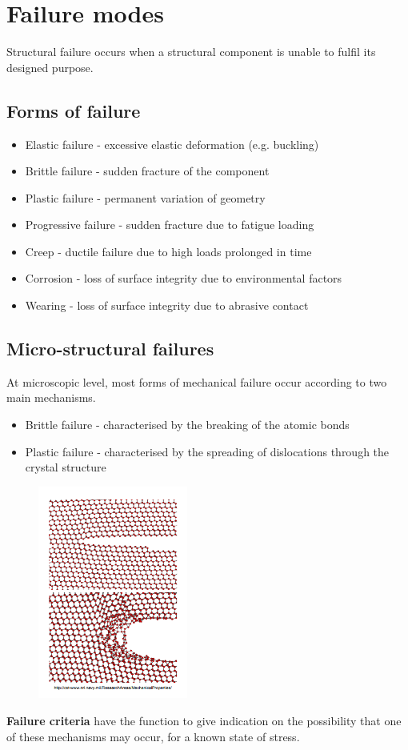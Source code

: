 \documentclass[class=report, crop=false, 12pt,a4paper]{standalone}
\begin{document}
\section{Failure modes}
Structural failure occurs when a structural component is unable to fulfil its designed purpose. 
\subsection{Forms of failure}
\begin{itemize}
  \item Elastic failure - excessive elastic deformation (e.g. buckling)
  \item Brittle failure - sudden fracture of the component
  \item Plastic failure - permanent variation of geometry
  \item Progressive failure - sudden fracture due to fatigue loading 
  \item Creep - ductile failure due to high loads prolonged in time
  \item Corrosion - loss of surface integrity due to environmental factors
  \item Wearing - loss of surface integrity due to abrasive contact
\end{itemize}
\subsection{Micro-structural failures}
At microscopic level, most forms of mechanical failure occur according to two main mechanisms.
\begin{itemize}
  \item Brittle failure - characterised by the breaking of the atomic bonds
  \item Plastic failure - characterised by the spreading of dislocations through the crystal structure
\end{itemize}
\begin{figure}[H]
  \centering
  \includegraphics[height = 7cm]{../img/diagram71.png}
  \caption{}
\end{figure}
\textbf{Failure criteria} have the function to give indication on the possibility that one of these mechanisms may occur, for a known state of stress.
\end{document}
